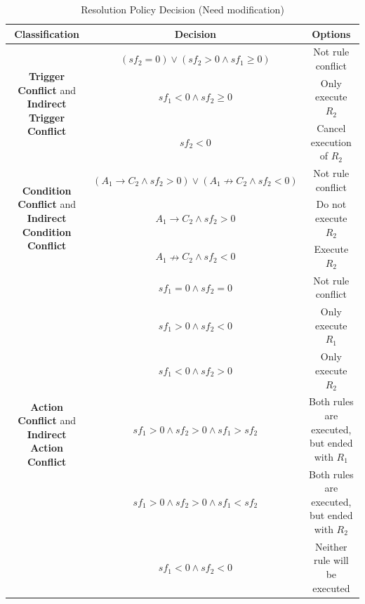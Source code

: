\begin{table}[htbp]
	\begin{center}
		\caption{Resolution Policy Decision (Need modification)}
		\label{Resolution_Policy_Decision}
		\begin{tabular}{c|c|c}
			\hline
			\textbf{Classification} & \textbf{Decision} & \textbf{Options} \\
			\hline
			\multirow{3}{*}{\textbf{Trigger Conflict} and \textbf{Indirect Trigger Conflict}} 
			& $(sf_2 = 0)\vee(sf_2>0 \wedge sf_1\geq 0)$ & Not rule conflict \\
			\cline{2-3}
			& $sf_1 < 0 \land sf_2 \geq 0$ & Only execute $R_2$ \\
			\cline{2-3}
			& $sf_2 < 0$ & Cancel execution of $R_2$ \\
			\hline
			\multirow{3}{*}{\textbf{Condition Conflict} and \textbf{Indirect Condition Conflict}} 
			& $(A_{1}\rightarrow C_{2}\wedge sf_{2}>0)\vee(A_{1}\nrightarrow C_{2}\wedge sf_{2}<0)$ & Not rule conflict \\
			\cline{2-3}
			& $A_{1}\rightarrow C_{2}\wedge sf_{2}>0$ & Do not execute $R_2$\\
			\cline{2-3}
			& $A_{1}\nrightarrow C_{2}\wedge sf_{2}<0$ & Execute $R_2$ \\
			\hline
			\multirow{6}{*}{\textbf{Action Conflict} and \textbf{Indirect Action Conflict}} 
			& $sf_1 = 0 \land sf_2 = 0$ & Not rule conflict \\
			\cline{2-3}
			& $sf_1 > 0 \land sf_2 < 0$ & Only execute $R_1$ \\
			\cline{2-3}
			& $sf_1 < 0 \land sf_2 > 0$ & Only execute $R_2$ \\
			\cline{2-3}
			& $sf_1 > 0 \land sf_2 > 0 \land sf_1 > sf_2$ & Both rules are executed, but ended with $R_1$ \\
			\cline{2-3}
			& $sf_1 > 0 \land sf_2 > 0 \land sf_1 < sf_2$ & Both rules are executed, but ended with $R_2$ \\
			\cline{2-3}
			& $sf_1 < 0 \land sf_2 < 0$ & Neither rule will be executed \\
			\hline
		\end{tabular}
	\end{center}
\end{table}

